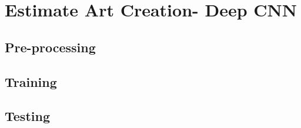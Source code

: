 \documentclass{article}
\begin{document}
\newpage
\section{Estimate Art Creation- Deep CNN}
\subsection{Pre-processing}
\subsection{Training}
\subsection{Testing}
\end{document}
